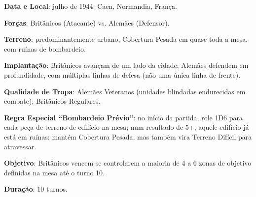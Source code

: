 \documentclass[11pt]{article}
\begin{document}
\textbf{Data e Local}: julho de 1944, Caen, Normandia, França.

\textbf{Forças}: Britânicos (Atacante) vs. Alemães (Defensor).

\textbf{Terreno}: predominantemente urbano, Cobertura Pesada em quase toda a mesa, com ruínas de bombardeio.

\textbf{Implantação}: Britânicos avançam de um lado da cidade; Alemães defendem em profundidade, com múltiplas linhas de defesa (não uma única linha de frente).

\textbf{Qualidade de Tropa}: Alemães Veteranos (unidades blindadas endurecidas em combate); Britânicos Regulares.

\textbf{Regra Especial ``Bombardeio Prévio''}: no início da partida, role 1D6 para cada peça de terreno de edifício na mesa; num resultado de 5+, aquele edifício já está em ruínas: mantém Cobertura Pesada, mas também vira Terreno Difícil para atravessar.

\textbf{Objetivo}: Britânicos vencem se controlarem a maioria de 4 a 6 zonas de objetivo definidas na mesa até o turno 10.

\textbf{Duração}: 10 turnos.
\end{document}
